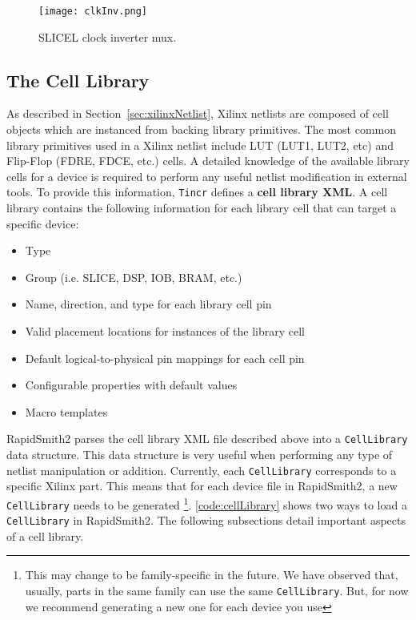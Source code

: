 \begin{figure}[h!]
  \centering
  \texttt{[image: clkInv.png]}
  \caption{SLICEL clock inverter mux.}
  \label{fig:clkInv}
\end{figure}

\subsection{The Cell Library} \label{sec:cellLibraryinDesignSection}
As described in Section~\ref{sec:xilinxNetlist}, Xilinx netlists are composed of
cell objects which are instanced from backing library primitives. The most
common library primitives used in a Xilinx netlist include LUT (LUT1,
LUT2, etc) and Flip-Flop (FDRE, FDCE, etc.) cells. A detailed knowledge of the
available library cells for a device is required to perform any useful netlist
modification in external tools. To provide this information, \texttt{Tincr}
defines a \textbf{cell library XML}. A cell library contains the
following information for each library cell that can target a specific device:

\begin {itemize}
  \item Type
  \item Group (i.e. SLICE, DSP, IOB, BRAM, etc.) 
  \item Name, direction, and type for each library cell pin
  \item Valid placement locations for instances of the library cell
  \item Default logical-to-physical pin mappings for each cell pin
  \item Configurable properties with default values
  \item Macro templates 
\end{itemize}

RapidSmith2 parses the cell library XML file described above into a
\texttt{CellLibrary} data structure. This data structure is very useful when
performing any type of netlist manipulation or addition. Currently, each \texttt{CellLibrary}
corresponds to a specific Xilinx part. This means that for each device file in
RapidSmith2, a new \texttt{CellLibrary} needs to be generated \footnote{This may
change to be family-specific in the future.  We have observed that, usually,
parts in the same family can use the same \texttt{CellLibrary}.  But, for now
we recommend generating a new one for each device you use}.
\autoref{code:cellLibrary} shows two ways to load a \texttt{CellLibrary} in RapidSmith2. The following
subsections detail important aspects of a cell library.

